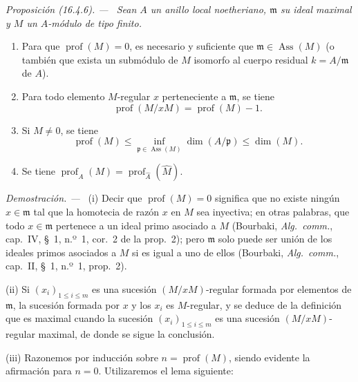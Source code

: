 \documentclass[10pt,oneside]{book}
\makeatletter
\newcommand{\setmanualcurrentlabel}[1]{\def\@currentlabel{#1}}
\newcommand{\oldpage}[2][]{%
  \setcounter{footnote}{0}%
  \marginpar{\scriptsize\textbf{#1}~|~#2}\ignorespaces}
\newenvironment{proposition}[1][]{%
  \setmanualcurrentlabel{#1}\par\medskip\noindent\itshape Proposición (#1). ---\ }{\par}
\newenvironment{proof}{%
  \par\medskip\noindent\textit{Demostración. ---\ }}{\par}
\makeatother
\begin{document}
\begin{proposition}[16.4.6]
\label{0.16.4.6-es}
Sean $A$ un anillo local noetheriano, $\mathfrak{m}$ su ideal maximal y $M$ un
$A$-módulo de tipo finito.
\begin{enumerate}
  \item[\rm{(i)}] Para que $\operatorname{prof}(M)=0$, es necesario y
  suficiente que $\mathfrak{m}\in\operatorname{Ass}(M)$ \textup{(o también que exista
  un submódulo de $M$ isomorfo al cuerpo residual $k=A/\mathfrak{m}$ de $A$)}.
  \item[\rm{(ii)}] Para todo elemento $M$-regular $x$ perteneciente a
  $\mathfrak{m}$, se tiene
  \begin{equation}
  \label{0.16.4.6.1-es}
  \tag{16.4.6.1}
    \operatorname{prof}(M/xM)=\operatorname{prof}(M)-1.
  \end{equation}
  \item[\rm{(iii)}] Si $M\neq0$, se tiene
  \begin{equation}
  \label{0.16.4.6.2-es}
  \tag{16.4.6.2}
    \operatorname{prof}(M)
    \leq\inf_{\mathfrak{p}\in\operatorname{Ass}(M)}\dim(A/\mathfrak{p})
    \leq\dim(M).
  \end{equation}
  \oldpage[0\textsubscript{IV-1}]{34}
  \item[\rm{(iv)}] Se tiene
  $\operatorname{prof}_A(M)=
  \operatorname{prof}_{\widehat{A}}(\widehat{M})$.
\end{enumerate}
\end{proposition}

\begin{proof}
(i) Decir que $\operatorname{prof}(M)=0$ significa que no existe ningún
$x\in\mathfrak{m}$ tal que la homotecia de razón $x$ en $M$ sea inyectiva; en
otras palabras, que todo $x\in\mathfrak{m}$ pertenece a un ideal primo
asociado a $M$ (Bourbaki, \emph{Alg.~comm.}, cap.~IV, \S~1, n.º~1, cor.~2 de
la prop.~2); pero $\mathfrak{m}$ solo puede ser unión de los ideales primos
asociados a $M$ si es igual a uno de ellos (Bourbaki,
\emph{Alg.~comm.}, cap.~II, \S~1, n.º~1, prop.~2).

(ii) Si $(x_i)_{1\leq i\leq m}$ es una sucesión $(M/xM)$-regular formada por
elementos de $\mathfrak{m}$, la sucesión formada por $x$ y los $x_i$ es
$M$-regular, y se deduce de la definición que es maximal cuando la sucesión
$(x_i)_{1\leq i\leq m}$ es una sucesión $(M/xM)$-regular maximal, de donde se
sigue la conclusión.

(iii) Razonemos por inducción sobre $n=\operatorname{prof}(M)$, siendo evidente
la afirmación para $n=0$. Utilizaremos el lema siguiente:
\end{proof}
\end{document}
